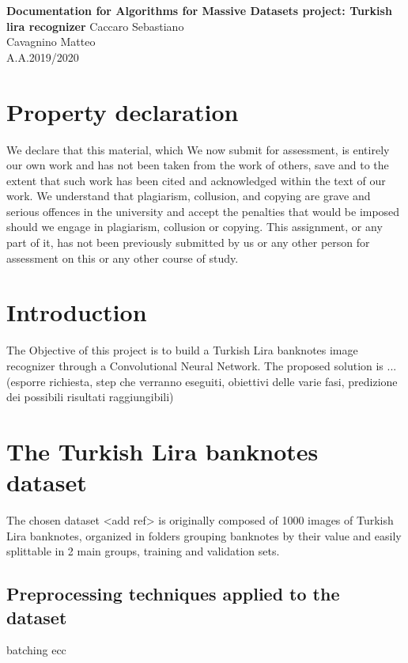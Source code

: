 \documentclass[a4paper,12pt]{article}
\begin{document}
\begin{titlepage}
\begin{center}
	\Large{\textbf{Documentation for Algorithms for Massive Datasets project: Turkish lira recognizer}}
\vfill
\normalsize{Caccaro Sebastiano}\\
\normalsize{Cavagnino Matteo}\\
\normalsize{A.A.2019/2020}
\end{center}
\end{titlepage}
\tableofcontents

\clearpage
\section{Property declaration}
We declare that this material, which We now submit for assessment, is entirely our own work and has not been taken from the work of others, save and to the extent that such work has been cited and acknowledged within the text of our work. We understand that plagiarism, collusion, and copying are grave and serious offences in the university and accept the penalties that would be imposed should we engage in plagiarism, collusion or copying. This assignment, or any part of it, has not been previously submitted by us or any other person for assessment on this or any other course of study.

\section{Introduction}
The Objective of this project is to build a Turkish Lira banknotes image recognizer through a Convolutional Neural Network.
The proposed solution is ... (esporre richiesta, step che verranno eseguiti, obiettivi delle varie fasi, predizione dei possibili risultati raggiungibili)

\section{The Turkish Lira banknotes dataset}
The chosen dataset <add ref> is originally composed of 1000 images of Turkish Lira banknotes, organized in folders grouping banknotes by their value and easily splittable in 2 main groups, training and validation sets.

\subsection{Preprocessing techniques applied to the dataset}
batching ecc
\end{document}

